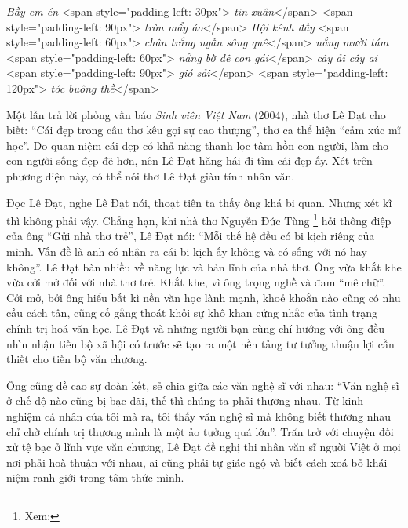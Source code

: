 \documentclass[../main.tex]{subfiles}
\begin{document}
\begin{multicols}{2}
\begin{blockquote}
\textit{Bầy em én} 
<span style="padding-left: 30px">\textit{                 tin xuân}</span>        
<span style="padding-left: 90px">\textit{                               tròn mẩy áo}</span> 
\textit{Hội kênh đầy}        
<span style="padding-left: 60px">\textit{                      chân trắng ngấn sông quê}</span> 
\textit{nắng mười tám}        
<span style="padding-left: 60px">\textit{                      nắng bờ đê con gái}</span> 
\textit{cây ải cây ai} 
<span style="padding-left: 90px">\textit{                        gió sải}</span> 
<span style="padding-left: 120px">\textit{                                   tóc buông thề}</span> 

\end{blockquote}
 
Một lần trả lời phỏng vấn báo \textit{Sinh viên Việt Nam} (2004), nhà thơ Lê Đạt cho biết: “Cái đẹp trong câu thơ kêu gọi sự cao thượng”, thơ ca thể hiện “cảm xúc mĩ học”. Do quan niệm cái đẹp có khả năng thanh lọc tâm hồn con người, làm cho con người sống đẹp đẽ hơn, nên Lê Đạt hăng hái đi tìm cái đẹp ấy. Xét trên phương diện này, có thể nói thơ Lê Đạt giàu tính nhân văn. 
 
Đọc Lê Đạt, nghe Lê Đạt nói, thoạt tiên ta thấy ông khá bi quan. Nhưng xét kĩ thì không phải vậy. Chẳng hạn, khi nhà thơ Nguyễn Đức Tùng \footnote{
Xem:}  hỏi thông điệp của ông “Gửi nhà thơ trẻ”, Lê Đạt nói: “Mỗi thế hệ đều có bi kịch riêng của mình. Vấn đề là anh có nhận ra cái bi kịch ấy không và có sống với nó hay không”. Lê Đạt bàn nhiều về năng lực và bản lĩnh của nhà thơ. Ông vừa khắt khe vừa cởi mở đối với nhà thơ trẻ. Khắt khe, vì ông trọng nghề và đam “mê chữ”. Cởi mở, bởi ông hiểu bất kì nền văn học lành mạnh, khoẻ khoắn nào cũng có nhu cầu cách tân, cũng cố gắng thoát khỏi sự khô khan cứng nhắc của  tình trạng chính trị hoá văn học. Lê Đạt và những người bạn cùng chí hướng với ông đều nhìn nhận tiến bộ xã hội có trước sẽ tạo ra một nền tảng tư tưởng thuận lợi cần thiết cho tiến bộ văn chương. 
 
Ông cũng đề cao sự đoàn kết, sẻ chia giữa các văn nghệ sĩ với nhau: “Văn nghệ sĩ ở chế độ nào cũng bị bạc đãi, thế thì chúng ta phải thương nhau. Từ kinh nghiệm cá nhân của tôi mà ra, tôi thấy văn nghệ sĩ mà không biết thương nhau chỉ chờ chính trị thương mình là một ảo tưởng quá lớn”. Trăn trở với chuyện đối xử tệ bạc ở lĩnh vực văn chương, Lê Đạt đề nghị thi nhân văn sĩ người Việt ở mọi nơi  phải hoà thuận với nhau, ai cũng phải tự giác ngộ và biết cách xoá bỏ khái niệm ranh giới trong tâm thức mình. 
 

\end{multicols}
\end{document}
